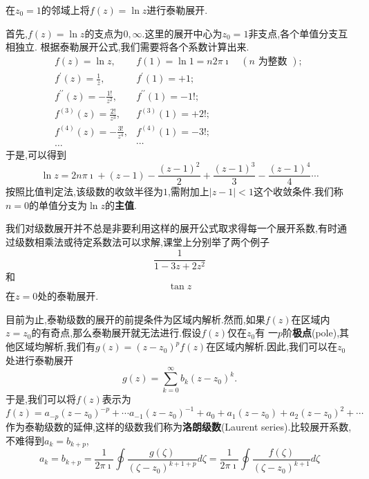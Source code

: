 \begin{example}
在$z_0=1$的邻域上将$f(z) = \ln{z}$进行泰勒展开.
\end{example}
\begin{solution}
    首先,$f(z) = \ln z $的支点为$0,\infty$.这里的展开中心为$z_0=1$非支点,各个单值分支互相独立.
    根据泰勒展开公式,我们需要将各个系数计算出来.
    \[
        \begin{array}{ll}
            f(z)=\ln z, & f(1)=\ln 1=n 2 \pi \imath \quad(n \text { 为整数 }) \text {; } \\
            f^{\prime}(z)=\frac{1}{z}, & f^{\prime}(1)=+1 ; \\
            f^{\prime \prime}(z)=-\frac{1 !}{z^2}, & f^{\prime \prime}(1)=-1 ! ; \\
            f^{(3)}(z)=\frac{2 !}{z^3}, & f^{(3)}(1)=+2 ! ; \\
            f^{(4)}(z)=-\frac{3 !}{z^4}, & f^{(4)}(1)=-3 ! ; \\
            \ldots & \cdots
            \end{array}
    \]
    于是,可以得到
    \[
    \ln z = 2 n \pi \imath + (z-1) - \frac{(z-1)^2}{2} +  \frac{(z-1)^3}{3} -  \frac{(z-1)^4}{4} \cdots
    \]
    按照比值判定法,该级数的收敛半径为$1$,需附加上$|z-1|< 1$这个收敛条件.我们称$n=0$的单值分支为$\ln z $的\textbf{主值}.
\end{solution}
我们对级数展开并不总是非要利用这样的展开公式取求得每一个展开系数,有时通过级数相乘法或待定系数法可以求解,课堂上分别举了两个例子
$$
\frac{1}{1-3z + 2z^2}
$$
和$$
\tan{z}
$$
在$z=0$处的泰勒展开.

目前为止,泰勒级数的展开的前提条件为区域内解析.然而,如果$f(z)$在区域内$z=z_0$的有奇点,那么泰勒展开就无法进行.假设$f(z)$仅在$z_0$有
一$p$阶\textbf{极点}(pole),其他区域均解析,我们有$g(z) = (z-z_0)^p f(z)$在区域内解析.因此,我们可以在$z_0$处进行泰勒展开
\begin{equation}
    g(z) = \sum_{k=0}^{\infty} b_k (z-z_0)^{k} .
\end{equation}
于是,我们可以将$f(z)$表示为
\begin{equation}
    f(z) = a_{-p} (z-z_0)^{-p} + \cdots a_{-1}(z-z_0)^{-1} + a_0 + a_{1} (z-z_0) + a_{2} (z-z_0)^2 + \cdots 
\end{equation}
作为泰勒级数的延伸,这样的级数我们称为\textbf{洛朗级数}(Laurent series).比较展开系数,不难得到$a_k = b_{k+p}$,
\begin{equation}
    a_k = b_{k+p} = \frac{1}{2\pi \imath} \oint \frac{g(\zeta)}{(\zeta - z_0)^{k+1+p}} d\zeta 
    = \frac{1}{2\pi \imath} \oint \frac{f(\zeta)}{(\zeta - z_0)^{k+1}} d\zeta
\end{equation}

